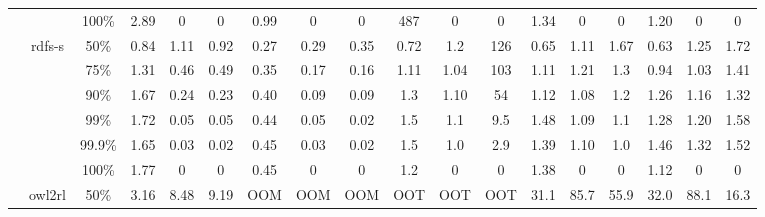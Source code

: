 \documentclass[sigconf,screen,review=false,natbib]{acmart}
\theoremstyle{definition}
\begin{document}
\begin{table*}
\begin{center}
\begin{tabular}{|c|c|c|c|c|c|c|c|c|c|c|c|c|c|c|c|c|c|}
			        &                         & 100\%  & 2.89                      & 0                                      & 0                          & 0.99                                    & 0                        & 0    & 487  & 0    & 0    & 1.34 & 0    & 0    & 1.20 & 0    & 0    \\
			\cline{2-18}
			        & \multirow{6}{*}{rdfs-s} & 50\%   & 0.84                      & 1.11                                   & 0.92                       & 0.27                                    & 0.29                     & 0.35 & 0.72 & 1.2  & 126  & 0.65 & 1.11 & 1.67 & 0.63 & 1.25 & 1.72 \\
			        &                         & 75\%   & 1.31                      & 0.46                                   & 0.49                       & 0.35                                    & 0.17                     & 0.16 & 1.11 & 1.04 & 103  & 1.11 & 1.21 & 1.3  & 0.94 & 1.03 & 1.41 \\
			        &                         & 90\%   & 1.67                      & 0.24                                   & 0.23                       & 0.40                                    & 0.09                     & 0.09 & 1.3  & 1.10 & 54   & 1.12 & 1.08 & 1.2  & 1.26 & 1.16 & 1.32 \\
			        &                         & 99\%   & 1.72                      & 0.05                                   & 0.05                       & 0.44                                    & 0.05                     & 0.02 & 1.5  & 1.1  & 9.5  & 1.48 & 1.09 & 1.1  & 1.28 & 1.20 & 1.58 \\
			        &                         & 99.9\% & 1.65                      & 0.03                                   & 0.02                       & 0.45                                    & 0.03                     & 0.02 & 1.5  & 1.0  & 2.9  & 1.39 & 1.10 & 1.0  & 1.46 & 1.32 & 1.52 \\
			        &                         & 100\%  & 1.77                      & 0                                      & 0                          & 0.45                                    & 0                        & 0    & 1.2  & 0    & 0    & 1.38 & 0    & 0    & 1.12 & 0    & 0    \\
			\cline{2-18}
			        & \multirow{6}{*}{owl2rl} & 50\%   & 3.16                      & 8.48                                   & 9.19                       & OOM                                     & OOM                      & OOM  & OOT  & OOT  & OOT  & 31.1 & 85.7 & 55.9 & 32.0 & 88.1 & 16.3 \\

\end{tabular}
\end{center}
\end{table*}
\end{document}
